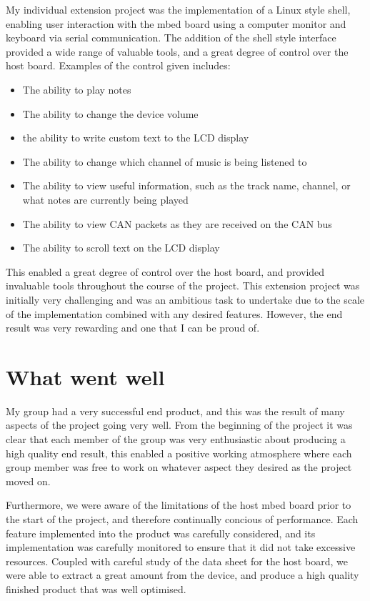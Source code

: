 My individual extension project was the implementation of a Linux style shell, 
enabling user interaction with the mbed board using a computer monitor and 
keyboard via serial communication. The addition of the shell style interface 
provided a wide range of valuable tools, and a great degree of control over the 
host board. Examples of the control given includes: 
\begin{itemize}
    \item The ability to play notes
    \item The ability to change the device volume
    \item the ability to write custom text to the LCD display 
    \item The ability to change which channel of music is being listened to
    \item The ability to view useful information, such as the track name, channel,
or what notes are currently being played
    \item The ability to view CAN packets as they are received on the CAN bus 
    \item The ability to scroll text on the LCD display 
\end{itemize}
This enabled a great degree of control over the host board, and provided 
invaluable tools throughout the course of the project. This extension project 
was initially very challenging and was an ambitious task to undertake due to the 
scale of the implementation combined with any desired features. However, the end 
result was very rewarding and one that I can be proud of. 

\section{What went well}

My group had a very successful end product, and this was the result of many 
aspects of the project going very well. From the beginning of the project it was 
clear that each member of the group was very enthusiastic about producing a high 
quality end result, this enabled a positive working atmosphere where each group 
member was free to work on whatever aspect they desired as the project moved on.
\par\bigskip\noindent
Furthermore, we were aware of the limitations of the host mbed board prior to the 
start of the project, and therefore continually concious of performance. Each 
feature implemented into the product was carefully considered, and its 
implementation was carefully monitored to ensure that it did not take excessive 
resources. Coupled with careful study of the data sheet for the host board, we 
were able to extract a great amount from the device, and produce a high quality 
finished product that was well optimised. 

